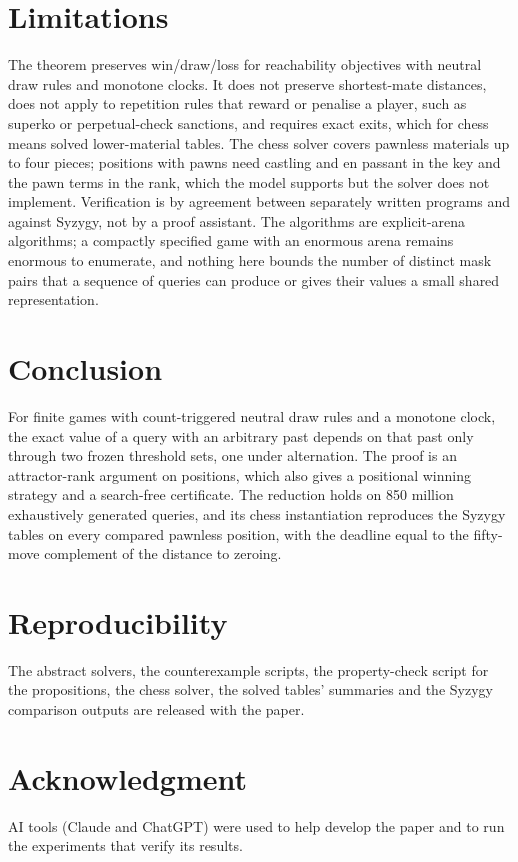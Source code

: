 \documentclass[journal]{IEEEtran}
\theoremstyle{definition}
\theoremstyle{remark}
\begin{document}
\section{Limitations}
The theorem preserves win/draw/loss for reachability objectives with neutral draw rules and monotone clocks. It does not preserve shortest-mate distances, does not apply to repetition rules that reward or penalise a player, such as superko or perpetual-check sanctions, and requires exact exits, which for chess means solved lower-material tables. The chess solver covers pawnless materials up to four pieces; positions with pawns need castling and en passant in the key and the pawn terms in the rank, which the model supports but the solver does not implement. Verification is by agreement between separately written programs and against Syzygy, not by a proof assistant. The algorithms are explicit-arena algorithms; a compactly specified game with an enormous arena remains enormous to enumerate, and nothing here bounds the number of distinct mask pairs that a sequence of queries can produce or gives their values a small shared representation.

\section{Conclusion}
For finite games with count-triggered neutral draw rules and a monotone clock, the exact value of a query with an arbitrary past depends on that past only through two frozen threshold sets, one under alternation. The proof is an attractor-rank argument on positions, which also gives a positional winning strategy and a search-free certificate. The reduction holds on 850 million exhaustively generated queries, and its chess instantiation reproduces the Syzygy tables on every compared pawnless position, with the deadline equal to the fifty-move complement of the distance to zeroing.

\section*{Reproducibility}
The abstract solvers, the counterexample scripts, the property-check script for the propositions, the chess solver, the solved tables' summaries and the Syzygy comparison outputs are released with the paper.

\section*{Acknowledgment}
AI tools (Claude and ChatGPT) were used to help develop the paper and to run the experiments that verify its results.
\end{document}
